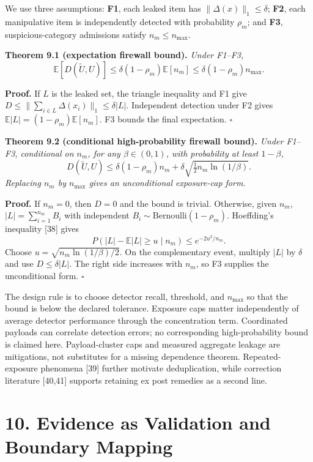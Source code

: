 \documentclass[
  11pt]{article}
\begin{document}
We use three assumptions: \textbf{F1}, each leaked item has \(\|\Delta(x)\|_1\leq\delta\); \textbf{F2}, each manipulative item is independently detected with probability \(\rho_m\); and \textbf{F3}, suspicious-category admissions satisfy \(n_m\leq n_{\max}\).

\textbf{Theorem 9.1 (expectation firewall bound).} \emph{Under F1--F3,} \[
\mathbb E[D(\widetilde U,U)]
\leq\delta(1-\rho_m)\mathbb E[n_m]
\leq\delta(1-\rho_m)n_{\max}.
\tag{21}
\]

\textbf{Proof.} If \(L\) is the leaked set, the triangle inequality and F1 give \(D\leq\|\sum_{i\in L}\Delta(x_i)\|_1\leq\delta|L|\). Independent detection under F2 gives \(\mathbb E|L|=(1-\rho_m)\mathbb E[n_m]\). F3 bounds the final expectation. \(\square\)

\textbf{Theorem 9.2 (conditional high-probability firewall bound).} \emph{Under F1--F3, conditional on \(n_m\), for any \(\beta\in(0,1)\), with probability at least \(1-\beta\),} \[
D(\widetilde U,U)\leq
\delta(1-\rho_m)n_m+
\delta\sqrt{\tfrac12n_m\ln(1/\beta)}.
\tag{22}
\] \emph{Replacing \(n_m\) by \(n_{\max}\) gives an unconditional exposure-cap form.}

\textbf{Proof.} If \(n_m=0\), then \(D=0\) and the bound is trivial. Otherwise, given \(n_m\), \(|L|=\sum_{i=1}^{n_m}B_i\) with independent \(B_i\sim\mathrm{Bernoulli}(1-\rho_m)\). Hoeffding's inequality {[}38{]} gives \[
P(|L|-\mathbb E|L|\geq u\mid n_m)\leq e^{-2u^2/n_m}.
\] Choose \(u=\sqrt{n_m\ln(1/\beta)/2}\). On the complementary event, multiply \(|L|\) by \(\delta\) and use \(D\leq\delta|L|\). The right side increases with \(n_m\), so F3 supplies the unconditional form. \(\square\)

The design rule is to choose detector recall, threshold, and \(n_{\max}\) so that the bound is below the declared tolerance. Exposure caps matter independently of average detector performance through the concentration term. Coordinated payloads can correlate detection errors; no corresponding high-probability bound is claimed here. Payload-cluster caps and measured aggregate leakage are mitigations, not substitutes for a missing dependence theorem. Repeated-exposure phenomena {[}39{]} further motivate deduplication, while correction literature {[}40,41{]} supports retaining ex post remedies as a second line.

\section{10. Evidence as Validation and Boundary Mapping}\label{evidence-as-validation-and-boundary-mapping}
\end{document}
